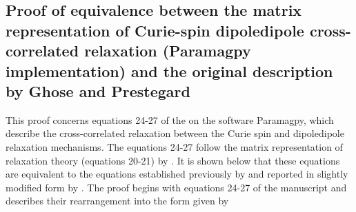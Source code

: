 \documentclass[a4paper,10pt,english,openany,oneside]{sphinxmanual}
\begin{document}
\subsection{Proof of equivalence between the matrix representation of Curie-spin dipole\textendash{}dipole cross-correlated relaxation (Paramagpy implementation) and the original description by Ghose and Prestegard}
\label{\detokenize{mathematical_proofs:proof-of-equivalence-between-the-matrix-representation-of-curie-spin-dipole-dipole-cross-correlated-relaxation-paramagpy-implementation-and-the-original-description-by-ghose-and-prestegard}}
This proof concerns equations 24-27 of the  on the software Paramagpy, which describe the cross-correlated relaxation between the Curie spin and dipole\textendash{}dipole relaxation mechanisms. The equations 24-27 follow the matrix representation of relaxation theory (equations 20-21) by  . It is shown below that these equations are equivalent to the equations established previously by  and reported in slightly modified form by . The proof begins with equations 24-27 of the manuscript and describes their rearrangement into the form given by 
\end{document}
